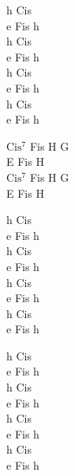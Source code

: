 \begin{chord}
    h Cis\\
    e Fis h\\
    h Cis\\
    e Fis h\\
    h Cis\\
    e Fis h\\
    h Cis\\
    e Fis h

    $\mathrm{Cis^7}$ Fis H G\\
    E Fis H\\
    $\mathrm{Cis^7}$ Fis H G\\
    E Fis H

    h Cis\\
    e Fis h\\
    h Cis\\
    e Fis h\\
    h Cis\\
    e Fis h\\
    h Cis\\
    e Fis h

    h Cis\\
    e Fis h\\
    h Cis\\
    e Fis h\\
    h Cis\\
    e Fis h\\
    h Cis\\
    e Fis h
\end{chord}
